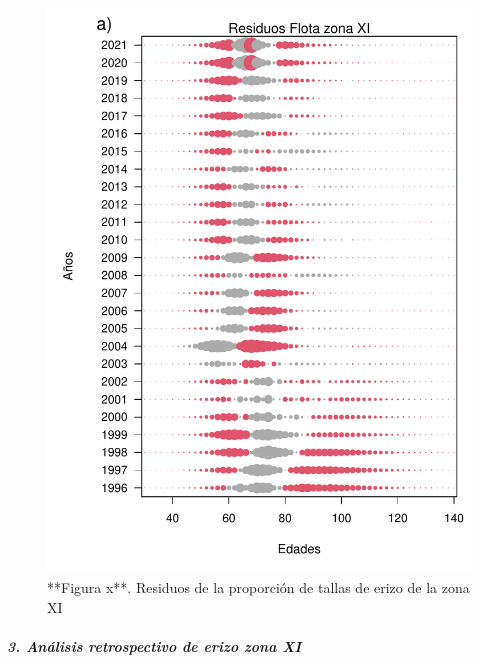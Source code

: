 \documentclass[
]{article}
\begin{document}
\begin{figure}

{\centering \includegraphics{Figuras/Fig_residuosCompXI-1} 

}

\caption{**Figura x**. Residuos de la proporción de tallas de erizo de la zona XI}\label{fig:Fig_residuosCompXI}
\end{figure}

\hypertarget{anuxe1lisis-retrospectivo-de-erizo-zona-xi}{%
\subparagraph{\texorpdfstring{\textbf{\emph{3. Análisis retrospectivo de
erizo zona
XI}}}{3. Análisis retrospectivo de erizo zona XI}}\label{anuxe1lisis-retrospectivo-de-erizo-zona-xi}}
\end{document}
